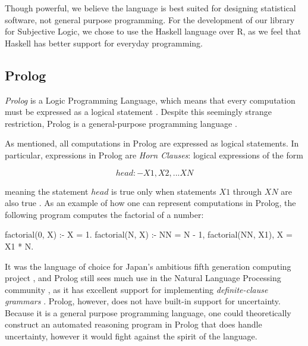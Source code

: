 \documentclass[thesis.tex]{subfiles}
\begin{document}
Though powerful, we believe the language is best suited for designing statistical software, not general purpose
programming. For the development of our library for Subjective Logic, we chose to use the Haskell
language over R, as we feel that Haskell has better support for everyday programming.





\subsection{Prolog}

\emph{Prolog} is a Logic Programming Language, which means that every computation must be
expressed as a logical statement \cite{sterling1994art}. Despite this seemingly strange restriction, Prolog is
a general-purpose programming language \cite{sterling1994art}.

As mentioned, all computations in Prolog are expressed as logical statements. In particular,
expressions in Prolog are \emph{Horn Clauses}: logical expressions of the form

$$
head :- X1, X2, ... XN
$$

meaning the statement $head$ is true only when statements $X1$ through $XN$ are also true \cite{horn1951sentences}.
As an example of how one can represent computations in Prolog, the following program computes
the factorial of a number:

\begin{code}
factorial(0, X) :- X = 1.
factorial(N, X) :- NN = N - 1, factorial(NN, X1), X = X1 * N.
\end{code}

It was the language of choice for Japan's ambitious fifth generation computing project \cite{shapiro1983fifth},
and Prolog still sees much use in the Natural Language Processing community
\cite{covington1994natural, pelletier2006representation},
as it has excellent support for implementing \emph{definite-clause grammars} \cite{pereira1980definite}.
Prolog, however, does not have built-in support for uncertainty. Because it is a general purpose
programming language, one could theoretically construct an automated reasoning program in Prolog that
does handle uncertainty, however it would fight against the spirit of the language.








%
%
\end{document}
